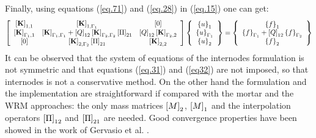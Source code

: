 Finally, using equations (\ref{eq.71}) and (\ref{eq.28}) in (\ref{eq.15}) one can get:
\begin{equation}
\label{eq.72}
\begin{aligned}
\left[ \begin{array}{ccc} 
    \left[{\mathbf{K}}\right]_{1,1} & \left[{\mathbf{K}}\right]_{1,\Gamma_1} & \left[{0}\right] \\
   \left[{\mathbf{K}}\right]_{\Gamma_1,1} & \left[{\mathbf{K}}\right]_{\Gamma_1,\Gamma_1}+ \left[{Q}\right]_{12}\left[{\mathbf{K}}\right]_{\Gamma_2,\Gamma_2}\left[{\Pi}\right]_{21} & \left[{Q}\right]_{12}\left[{\mathbf{K}}\right]_{\Gamma_2,2}\\   
    \left[{0}\right] & \left[{\mathbf{K}}\right]_{2,\Gamma_2}\left[{\Pi}\right]_{21} & \left[{\mathbf{K}}\right]_{2,2}\end{array} \right] \left\lbrace \begin{array}{c} \left\lbrace{u}\right \rbrace_1\\\left\lbrace{u}\right \rbrace_{\Gamma_1}\\\left\lbrace{u}\right \rbrace_2
    \end{array}\right\rbrace= \left\lbrace\begin{array}{c} \left\lbrace{f}\right \rbrace_1\\\left\lbrace{f}\right \rbrace_{\Gamma_1}+\left[{Q}\right]_{12}\left\lbrace{f}\right \rbrace_{\Gamma_2}\\\left\lbrace{f}\right \rbrace_2
    \end{array}\right\rbrace
    \end{aligned}
\end{equation}
It can be observed that the system of equations of the internodes formulation is not symmetric and that equations (\ref{eq.31}) and (\ref{eq32}) are not imposed, so that internodes is not a conservative method. On the other hand the formulation and the implementation are straightforward if compared with the mortar and the WRM approaches: the only mass matrices $\left[{M}\right]_2$, $\left[{M}\right]_1$ and the interpolation operators $\left[{\Pi}\right]_{12}$ and $\left[{\Pi}\right]_{21}$ are needed. Good convergence properties have been showed in the work of Gervasio et al. \cite{gervasio2016analysis}.
